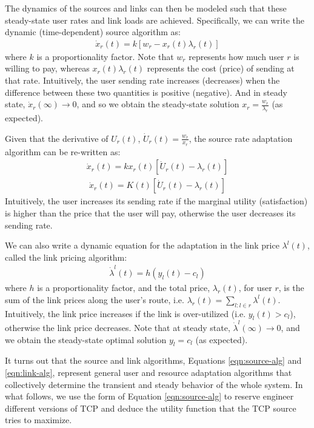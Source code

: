 \documentclass{article}
\begin{document}
The dynamics of the sources and links can then be modeled such that these steady-state user rates and link loads are achieved. Specifically, we can write the dynamic (time-dependent) source algorithm as:
\begin{eqnarray}
\dot{x}_r (t) = k [w_r - x_r(t) \lambda_r(t)]
\label{eqn:source-adapt}
\end{eqnarray}
where $k$ is a proportionality factor.
Note that $w_r$ represents how much user $r$ is willing to pay,
whereas $x_r(t) \lambda_r(t)$ represents the cost (price) of sending at that rate.
Intuitively, the user sending rate increases (decreases) when the difference between these two quantities is positive (negative). And in steady state, $\dot{x}_r(\infty) \rightarrow 0$, and so we obtain the steady-state solution  $x_r = \frac{w_r}{\lambda_r}$ (as expected).

Given that the derivative of  $U_r(t)$, $\dot{U}_r(t) = \frac{w_r}{x_r}$, 
the source rate adaptation algorithm can be re-written as:
\begin{eqnarray*}
\dot{x}_r (t) = k x_r(t) [\dot{U}_r(t) - \lambda_r(t)]
\end{eqnarray*}
%
\begin{eqnarray}
\dot{x}_r (t) = K(t) [\dot{U}_r(t) - \lambda_r(t)]
\label{eqn:source-alg}
\end{eqnarray}
Intuitively, the user increases its sending rate if the marginal utility (satisfaction) is higher than the price that the user will pay, otherwise the user decreases its sending rate.


We can also write a dynamic equation for the adaptation in the link price $\lambda^l(t)$, called the link pricing algorithm:
\begin{eqnarray}
\dot{\lambda}^l(t) = h (y_l(t) - c_l)
\label{eqn:link-alg}
\end{eqnarray}
where $h$ is a proportionality factor, and the total price, $\lambda_r(t)$, for user $r$,
is the sum of the link prices along the user's route, i.e. $\lambda_r(t) =  \sum_{l: l \in r} \lambda^l(t)$.
Intuitively, the link price increases if the link is over-utilized (i.e. $y_l(t) > c_l$), otherwise
the link price decreases.
Note that at steady state, $\dot{\lambda}^l(\infty) \rightarrow 0$, and 
we obtain the steady-state optimal solution $y_l = c_l$ (as expected).

It turns out that the source and link algorithms, Equations \ref{eqn:source-alg} and \ref{eqn:link-alg},
represent general user and resource adaptation algorithms that collectively determine 
the transient and steady behavior of the whole system.
In what follows, we use the form of Equation \ref{eqn:source-alg} to reserve engineer different versions
of TCP and deduce the utility function that the TCP source tries to maximize.
\end{document}
